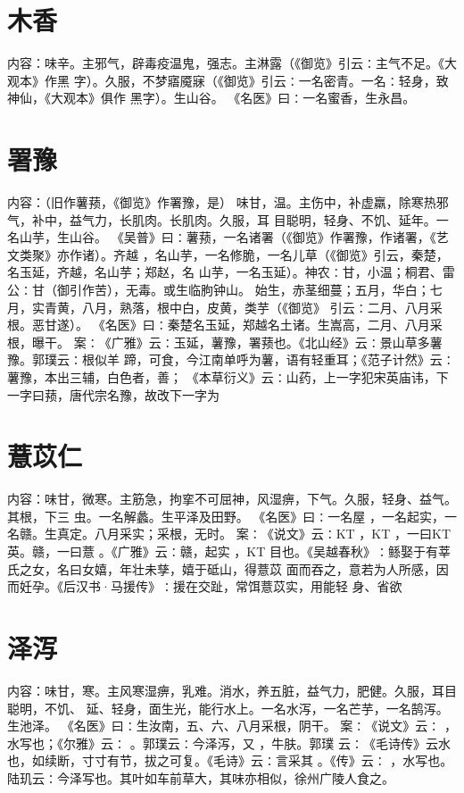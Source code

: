 \documentclass[12pt,UTF8]{ctexbook}
\begin{document}
\section{木香}
内容：味辛。主邪气，辟毒疫温鬼，强志。主淋露（《御览》引云∶主气不足。《大观本》作黑 
字）。久服，不梦寤魇寐（《御览》引云∶一名密青。一名∶轻身，致神仙，《大观本》俱作 
黑字）。生山谷。 
《名医》曰∶一名蜜香，生永昌。 


\section{署豫}
内容：（旧作薯蓣，《御览》作署豫，是） 
味甘，温。主伤中，补虚羸，除寒热邪气，补中，益气力，长肌肉。长肌肉。久服，耳 
目聪明，轻身、不饥、延年。一名山芋，生山谷。 
《吴普》曰∶薯蓣，一名诸署（《御览》作署豫，作诸署，《艺文类聚》亦作诸）。齐越 
，名山芋，一名修脆，一名儿草（《御览》引云，秦楚，名玉延，齐越，名山芋；郑赵，名 
山芋，一名玉延）。神农∶甘，小温；桐君、雷公∶甘（御引作苦），无毒。或生临朐钟山。 
始生，赤茎细蔓；五月，华白；七月，实青黄，八月，熟落，根中白，皮黄，类芋（《御览》 
引云∶二月、八月采根。恶甘遂）。 
《名医》曰∶秦楚名玉延，郑越名土诸。生嵩高，二月、八月采根，曝干。 
案∶《广雅》云∶玉延，薯豫，署蓣也。《北山经》云∶景山草多薯豫。郭璞云∶根似羊 
蹄，可食，今江南单呼为薯，语有轻重耳；《范子计然》云∶薯豫，本出三辅，白色者，善； 
《本草衍义》云∶山药，上一字犯宋英庙讳，下一字曰蓣，唐代宗名豫，故改下一字为 


\section{薏苡仁}
内容：味甘，微寒。主筋急，拘挛不可屈神，风湿痹，下气。久服，轻身、益气。其根，下三 
虫。一名解蠡。生平泽及田野。 
《名医》曰∶一名屋 ，一名起实，一名赣。生真定。八月采实；采根，无时。 
案∶《说文》云∶KT ，KT ，一曰KT 英。赣，一曰薏 。《广雅》云∶赣，起实 
，KT 目也。《吴越春秋》∶鲧娶于有莘氏之女，名曰女嬉，年壮未孳，嬉于砥山，得薏苡 
面而吞之，意若为人所感，因而妊孕。《后汉书·马援传》∶援在交趾，常饵薏苡实，用能轻 
身、省欲 


\section{泽泻}
内容：味甘，寒。主风寒湿痹，乳难。消水，养五脏，益气力，肥健。久服，耳目聪明，不饥、 
延、轻身，面生光，能行水上。一名水泻，一名芒芋，一名鹄泻。生池泽。 
《名医》曰∶生汝南，五、六、八月采根，阴干。 
案∶《说文》云∶ ，水写也；《尔雅》云∶ 。郭璞云∶今泽泻，又 ，牛肤。郭璞 
云∶《毛诗传》云水 也，如续断，寸寸有节，拔之可复。《毛诗》云∶言采其 。《传》云∶ 
，水写也。陆玑云∶今泽写也。其叶如车前草大，其味亦相似，徐州广陵人食之。 
\end{document}
